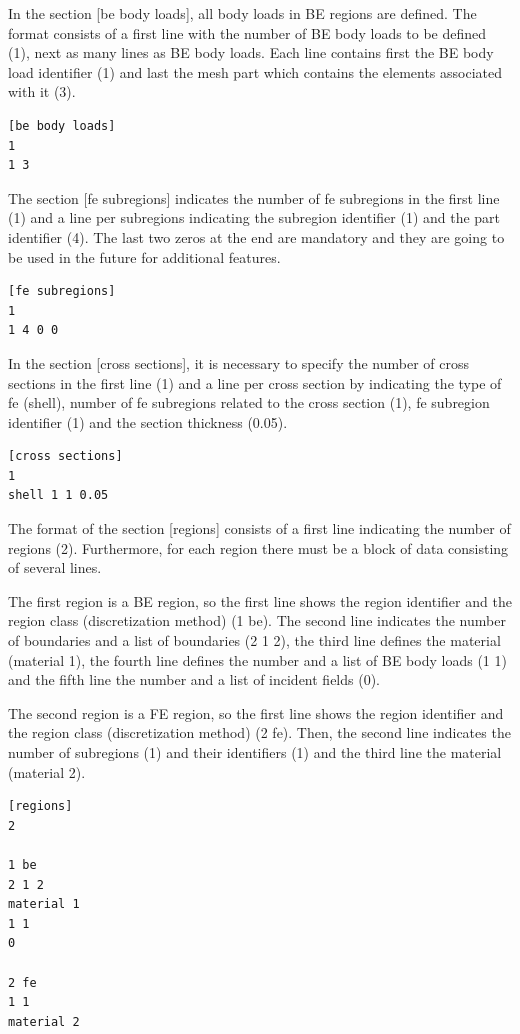 \documentclass[a4]{article}
\begin{document}
In the section [be body loads], all body loads in BE regions are defined. The format consists of a first line with the number of BE body loads to be defined (1), next as many lines as BE body loads. Each line contains first the BE body load identifier (1) and last the mesh part which contains the elements associated with it (3).

\begin{Verbatim}
[be body loads]
1
1 3
\end{Verbatim}

The section [fe subregions] indicates the number of fe subregions in the first line (1) and a line per subregions indicating the subregion identifier (1) and the part identifier (4). The last two zeros at the end are mandatory and they are going to be used in the future for additional features.

\begin{Verbatim}
[fe subregions]
1
1 4 0 0
\end{Verbatim}

In the section [cross sections], it is necessary to specify the number of cross sections in the first line (1) and a line per cross section by indicating the type of fe (shell), number of fe subregions related to the cross section (1), fe subregion identifier (1) and the section thickness (0.05).

\begin{Verbatim}
[cross sections]
1
shell 1 1 0.05
\end{Verbatim}

The format of the section [regions] consists of a first line indicating the number of regions (2). Furthermore, for each region there must be a block of data consisting of several lines. 

The first region is a BE region, so the first line shows the region identifier and the region class (discretization method) (1 be). The second line indicates the number of boundaries and a list of boundaries (2 1 2), the third line defines the material (material 1), the fourth line defines the number and a list of BE body loads (1 1) and the fifth line the number and a list of incident fields (0).

The second region is a FE region, so the first line shows the region identifier and the region class (discretization method) (2 fe). Then, the second line indicates the number of subregions (1) and their identifiers (1) and the third line the material (material 2). 

\begin{Verbatim}	
[regions]
2

1 be
2 1 2
material 1 
1 1
0

2 fe
1 1
material 2 
\end{Verbatim}
\end{document}
